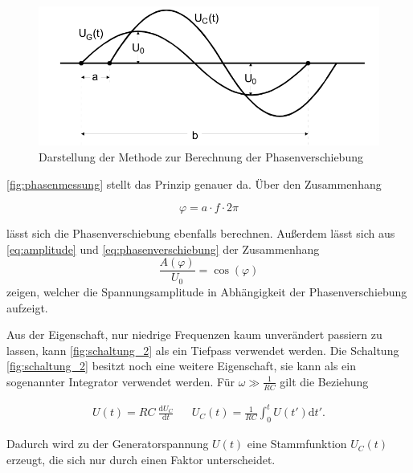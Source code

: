 \begin{figure}
    \centering
    \includegraphics[width=\textwidth/2]{images/phasenmessung.png}
    \caption{Darstellung der Methode zur Berechnung der Phasenverschiebung  \cite{V353}}
    \label{fig:phasenmessung}
\end{figure}

\autoref{fig:phasenmessung} stellt das Prinzip genauer da. Über den Zusammenhang

\begin{equation}
    \label{eq:phasenverschiebung2}
    \varphi = a \cdot f \cdot 2\pi
\end{equation}

lässt sich die Phasenverschiebung ebenfalls berechnen.
Außerdem lässt sich aus \autoref{eq:amplitude} und \autoref{eq:phasenverschiebung} der Zusammenhang
\begin{equation}
    \label{eq:spannung_phase}
    \frac{A(\varphi)}{U_0} = \cos(\varphi)
\end{equation}
zeigen, welcher die Spannungsamplitude in Abhängigkeit der Phasenverschiebung aufzeigt.

Aus der Eigenschaft, nur niedrige Frequenzen kaum unverändert passiern zu lassen, kann \autoref{fig:schaltung_2} als ein Tiefpass verwendet werden. \cite{V353}
Die Schaltung \autoref{fig:schaltung_2} besitzt noch eine weitere Eigenschaft, sie kann als ein sogenannter Integrator verwendet werden. Für $\omega \gg \frac{1}{RC}$ gilt die Beziehung

\begin{align}
    \label{eq:integrator}
    U (t) = RC \: \frac{\mathrm{d} U_C}{\mathrm{d}t}  && U_C (t) = \frac{1}{RC} \int _0^t U (t') \mathrm{d} t'.
\end{align}

Dadurch wird zu der Generatorspannung $U (t)$ eine Stammfunktion $U_C (t)$ erzeugt, die sich nur durch einen Faktor unterscheidet. \cite{V353}
